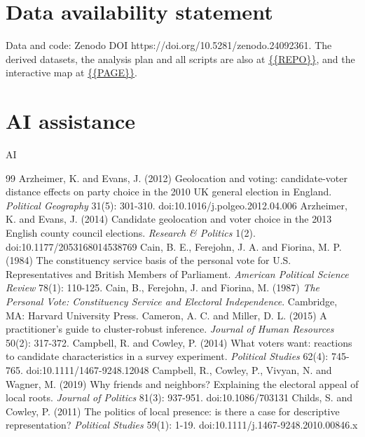 \documentclass[11pt,a4paper]{article}
\begin{document}
\section*{Data availability statement}
Data and code: Zenodo DOI https://doi.org/10.5281/zenodo.24092361. The derived datasets, the analysis plan and all scripts are also at \url{{{REPO}}}, and the interactive map at \url{{{PAGE}}}.

\section*{AI assistance}
{{AI}}

\begin{thebibliography}{99}
 Arzheimer, K. and Evans, J. (2012) Geolocation and voting: candidate-voter distance effects on party choice in the 2010 UK general election in England. \textit{Political Geography} 31(5): 301-310. doi:10.1016/j.polgeo.2012.04.006
 Arzheimer, K. and Evans, J. (2014) Candidate geolocation and voter choice in the 2013 English county council elections. \textit{Research \& Politics} 1(2). doi:10.1177/2053168014538769
 Cain, B. E., Ferejohn, J. A. and Fiorina, M. P. (1984) The constituency service basis of the personal vote for U.S. Representatives and British Members of Parliament. \textit{American Political Science Review} 78(1): 110-125.
 Cain, B., Ferejohn, J. and Fiorina, M. (1987) \textit{The Personal Vote: Constituency Service and Electoral Independence}. Cambridge, MA: Harvard University Press.
 Cameron, A. C. and Miller, D. L. (2015) A practitioner's guide to cluster-robust inference. \textit{Journal of Human Resources} 50(2): 317-372.
 Campbell, R. and Cowley, P. (2014) What voters want: reactions to candidate characteristics in a survey experiment. \textit{Political Studies} 62(4): 745-765. doi:10.1111/1467-9248.12048
 Campbell, R., Cowley, P., Vivyan, N. and Wagner, M. (2019) Why friends and neighbors? Explaining the electoral appeal of local roots. \textit{Journal of Politics} 81(3): 937-951. doi:10.1086/703131
 Childs, S. and Cowley, P. (2011) The politics of local presence: is there a case for descriptive representation? \textit{Political Studies} 59(1): 1-19. doi:10.1111/j.1467-9248.2010.00846.x

\end{thebibliography}
\end{document}
